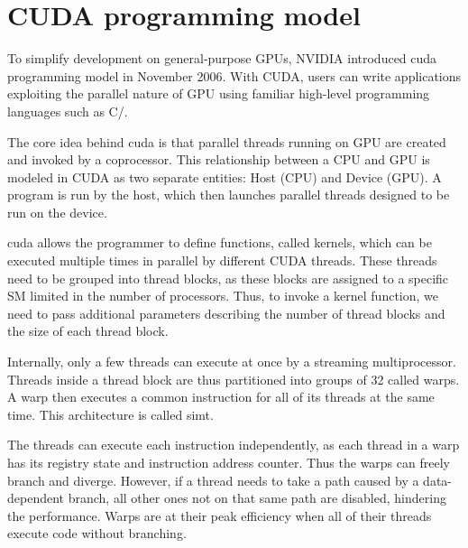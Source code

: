 \section{CUDA programming model}

To simplify development on general-purpose GPUs, NVIDIA introduced \acrfull{cuda} programming model in November 2006. With CUDA, users can write applications exploiting the parallel nature of GPU using familiar high-level programming languages such as C/\CC.

The core idea behind \acrshort{cuda} is that parallel threads running on GPU are created and invoked by a coprocessor. This relationship between a CPU and GPU is modeled in CUDA as two separate entities: Host (CPU) and Device (GPU). A program is run by the host, which then launches parallel threads designed to be run on the device.

\acrshort{cuda} allows the programmer to define functions, called kernels, which can be executed multiple times in parallel by different CUDA threads. These threads need to be grouped into thread blocks, as these blocks are assigned to a specific SM limited in the number of processors. Thus, to invoke a kernel function, we need to pass additional parameters describing the number of thread blocks and the size of each thread block.

Internally, only a few threads can execute at once by a streaming multiprocessor. Threads inside a thread block are thus partitioned into groups of 32 called warps. A warp then executes a common instruction for all of its threads at the same time. This architecture is called \acrfull{simt}.

The threads can execute each instruction independently, as each thread in a warp has its registry state and instruction address counter. Thus the warps can freely branch and diverge. However, if a thread needs to take a path caused by a data-dependent branch, all other ones not on that same path are disabled, hindering the performance. Warps are at their peak efficiency when all of their threads execute code without branching.